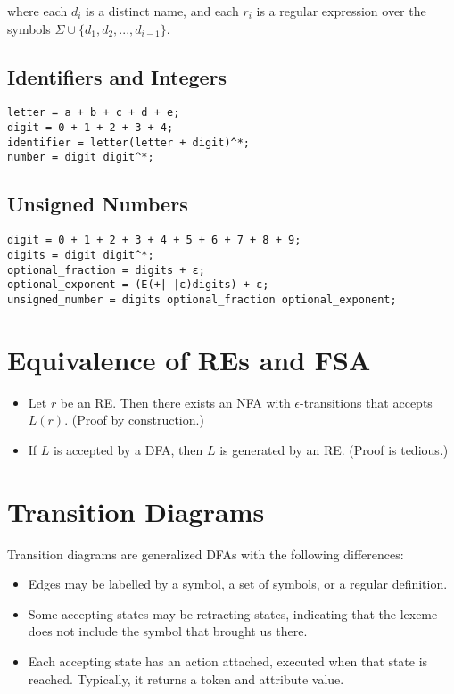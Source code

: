 \documentclass[12pt,a4paper]{article}
\begin{document}
where each $d_i$ is a distinct name, and each $r_i$ is a regular expression over the symbols $\Sigma \cup \{d_1, d_2, ..., d_{i-1}\}$.

\subsection*{Identifiers and Integers}
\begin{verbatim}
letter = a + b + c + d + e;
digit = 0 + 1 + 2 + 3 + 4;
identifier = letter(letter + digit)^*;
number = digit digit^*;
\end{verbatim}

\subsection*{Unsigned Numbers}
\begin{verbatim}
digit = 0 + 1 + 2 + 3 + 4 + 5 + 6 + 7 + 8 + 9;
digits = digit digit^*;
optional_fraction = digits + ε;
optional_exponent = (E(+|-|ε)digits) + ε;
unsigned_number = digits optional_fraction optional_exponent;
\end{verbatim}

\section*{Equivalence of REs and FSA}
\begin{itemize}
    \item Let $r$ be an RE. Then there exists an NFA with $\epsilon$-transitions that accepts $L(r)$. (Proof by construction.)
    \item If $L$ is accepted by a DFA, then $L$ is generated by an RE. (Proof is tedious.)
\end{itemize}

\section*{Transition Diagrams}
Transition diagrams are generalized DFAs with the following differences:
\begin{itemize}
    \item Edges may be labelled by a symbol, a set of symbols, or a regular definition.
    \item Some accepting states may be retracting states, indicating that the lexeme does not include the symbol that brought us there.
    \item Each accepting state has an action attached, executed when that state is reached. Typically, it returns a token and attribute value.
\end{itemize}
\end{document}

